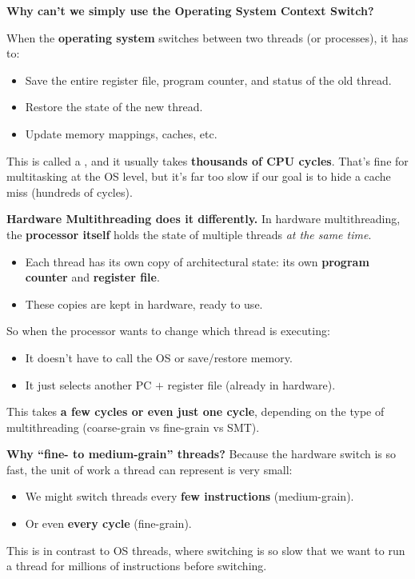 \begin{flushleft}
    \textcolor{Green3}{ \textbf{Why can't we simply use the Operating System Context Switch?}}
\end{flushleft}
When the \textbf{operating system} switches between two threads (or processes), it has to:
\begin{itemize}
    \item Save the entire register file, program counter, and status of the old thread.
    \item Restore the state of the new thread.
    \item Update memory mappings, caches, etc.
\end{itemize}
This is called a , and it usually takes \textbf{thousands of CPU cycles}. That's fine for multitasking at the OS level, but it's far too slow if our goal is to hide a cache miss (hundreds of cycles).

\highspace
\textcolor{Green3}{\faIcon{\speedIcon} \textbf{Hardware Multithreading does it differently.}} In hardware multithreading, the \textbf{processor itself} holds the state of multiple threads \emph{at the same time}.
\begin{itemize}
    \item Each thread has its own copy of architectural state: its own \textbf{program counter} and \textbf{register file}.
    \item These copies are kept in hardware, ready to use.
\end{itemize}
So when the processor wants to change which thread is executing:
\begin{itemize}
    \item[\textcolor{Red2}{\faIcon{times}}] It doesn't have to call the OS or save/restore memory.
    \item[\textcolor{Green3}{\faIcon{check}}] It just selects another PC $+$ register file (already in hardware).
\end{itemize}
This takes \textbf{a few cycles or even just one cycle}, depending on the type of multithreading (coarse-grain vs fine-grain vs SMT).

\highspace
\textcolor{Green3}{ \textbf{Why ``fine- to medium-grain'' threads?}} Because the hardware switch is so fast, the unit of work a thread can represent is very small:
\begin{itemize}
    \item We might switch threads every \textbf{few instructions} (medium-grain).
    \item Or even \textbf{every cycle} (fine-grain).
\end{itemize}
This is in contrast to OS threads, where switching is so slow that we want to run a thread for millions of instructions before switching.

